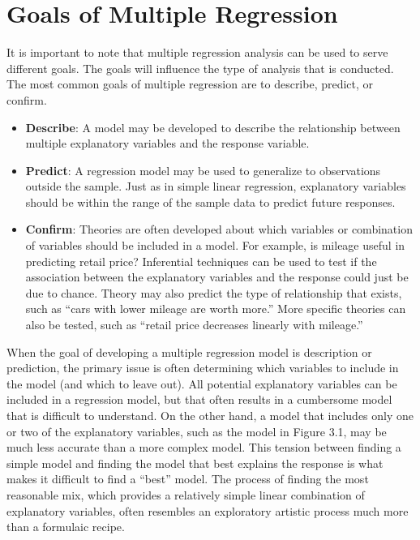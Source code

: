 \documentclass[
]{report}
\providecommand{\tightlist}{%
  \setlength{\itemsep}{0pt}\setlength{\parskip}{0pt}}
\begin{document}
\newpage

\section{Goals of Multiple Regression}\label{goals-of-multiple-regression}

It is important to note that multiple regression analysis can be used to serve different goals. The goals will influence the type of analysis that is conducted. The most common goals of multiple regression are to describe, predict, or confirm.

\begin{itemize}
\tightlist
\item
  \textbf{Describe}: A model may be developed to describe the relationship between multiple explanatory variables and the response variable.
\item
  \textbf{Predict}: A regression model may be used to generalize to observations outside the sample. Just as in simple linear regression, explanatory variables should be within the range of the sample data to predict future responses.
\item
  \textbf{Confirm}: Theories are often developed about which variables or combination of variables should be included in a model. For example, is mileage useful in predicting retail price? Inferential techniques can be used to test if the association between the explanatory variables and the response could just be due to chance. Theory may also predict the type of relationship that exists, such as ``cars with lower mileage are worth more.'' More specific theories can also be tested, such as ``retail price decreases linearly with mileage.''
\end{itemize}

When the goal of developing a multiple regression model is description or prediction, the primary issue is often determining which variables to include in the model (and which to leave out). All potential explanatory variables can be included in a regression model, but that often results in a cumbersome model that is difficult to understand. On the other hand, a model that includes only one or two of the explanatory variables, such as the model in Figure 3.1, may be much less accurate than a more complex model. This tension between finding a simple model and finding the model that best explains the response is what makes it difficult to find a ``best'' model. The process of finding the most reasonable mix, which provides a relatively simple linear combination of explanatory variables, often resembles an exploratory artistic process much more than a formulaic recipe.
\end{document}
